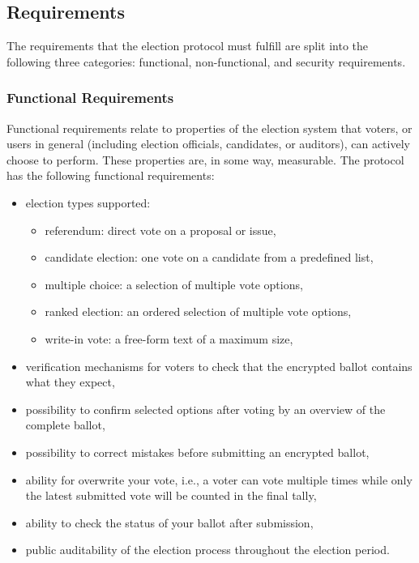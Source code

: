 \subsection{Requirements} \label{sec: requirements}
The requirements that the election protocol must fulfill are split into the following three categories: functional, non-functional, and security requirements.


\subsubsection{Functional Requirements} \label{sec: functional requirements}
Functional requirements relate to properties of the election system that voters, or users in general (including election officials, candidates, or auditors), can actively choose to perform. These properties are, in some way, measurable. The protocol has the following functional requirements:

\begin{itemize}
    \item election types supported:
    \begin{itemize}
        \item referendum: direct vote on a proposal or issue,
        \item candidate election: one vote on a candidate from a predefined list,
        \item multiple choice: a selection of multiple vote options,
        \item ranked election: an ordered selection of multiple vote options,
        \item write-in vote: a free-form text of a maximum size,
    \end{itemize}
    \item verification mechanisms for voters to check that the encrypted ballot contains what they expect,
    \item possibility to confirm selected options after voting by an overview of the complete ballot,
    \item possibility to correct mistakes before submitting an encrypted ballot,
    \item ability for overwrite your vote, i.e., a voter can vote multiple times while only the latest submitted vote will be counted in the final tally,
    \item ability to check the status of your ballot after submission,
    \item public auditability of the election process throughout the election period.
\end{itemize}



